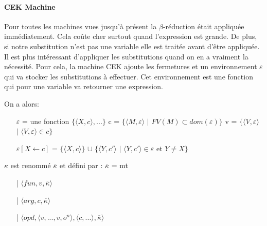 \documentclass[10pt,a4paper]{report}
\begin{document}
	
	
	\paragraph{CEK Machine}
	
	Pour toutes les machines vues jusqu'à présent la $\beta$-réduction était appliquée immédiatement. Cela coûte cher surtout quand l'expression est grande. De plus, si notre substitution n'est pas une variable elle est traitée avant d'être appliquée.
	\smallbreak
	Il est plus intéressant d'appliquer les substitutions quand on en a vraiment la nécessité. Pour cela, la machine CEK ajoute les fermetures et un environnement $\varepsilon$ qui va stocker les substitutions à effectuer. Cet environnement est une fonction qui pour une variable va retourner une expression.
	\medbreak
	
	On a alors:
	\begin{itemize}
		\item[] $\varepsilon$ = une fonction $\{\langle X,c\rangle,...\}$    c = $\{\langle M,\varepsilon\rangle$ $|$ $FV(M)\subset dom(\varepsilon)\}$    v = $\{\langle V,\varepsilon\rangle$ $|$ $\langle V,\varepsilon\rangle \in c\}$
		\item[] $\varepsilon[X \leftarrow c]$ = $\{\langle X,c\rangle\}$ $\cup$ $\{\langle Y,c'\rangle$ $|$ $\langle Y,c'\rangle \in \varepsilon$ et $ Y \neq X\}$
	\end{itemize}
	\medbreak
	
	$\kappa$ est renommé $\overline{\kappa}$ et défini par :
	\smallbreak
	$\overline{\kappa}$ = mt
	\begin{itemize}
		\item[|] $\langle fun,v,\overline{\kappa} \rangle$
		\item[|] $\langle arg,c,\overline{\kappa} \rangle$
		\item[|] $\langle opd,\langle v,...,v,o^{n}\rangle,\langle c,... \rangle,\overline{\kappa} \rangle$
	\end{itemize}
	\bigbreak
	
\end{document}
